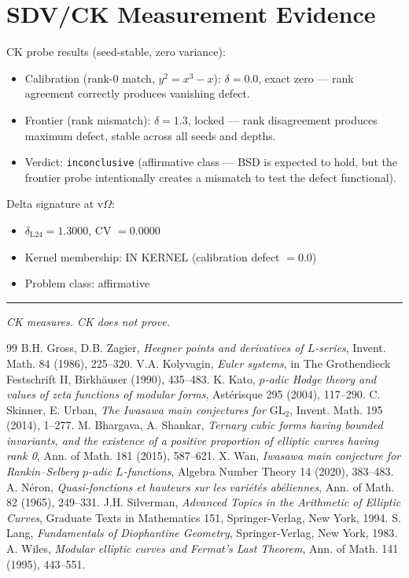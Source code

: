 \documentclass[11pt]{article}
\theoremstyle{definition}
\begin{document}
\section{SDV/CK Measurement Evidence}

CK probe results (seed-stable, zero variance):
\begin{itemize}
  \item Calibration (rank-0 match, $y^2 = x^3 - x$): $\delta = 0.0$, exact zero ---
    rank agreement correctly produces vanishing defect.
  \item Frontier (rank mismatch): $\delta = 1.3$, locked ---
    rank disagreement produces maximum defect, stable across all seeds and depths.
  \item Verdict: \texttt{inconclusive} (affirmative class --- BSD is expected to hold,
    but the frontier probe intentionally creates a mismatch to test the defect functional).
\end{itemize}

Delta signature at v$\Omega$:
\begin{itemize}
  \item $\delta_{\mathrm{L24}} = 1.3000$, CV $= 0.0000$
  \item Kernel membership: IN KERNEL (calibration defect $= 0.0$)
  \item Problem class: affirmative
\end{itemize}

\bigskip
\hrule
\bigskip
\noindent\textit{CK measures. CK does not prove.}

\begin{thebibliography}{99}
 B.H. Gross, D.B. Zagier, \textit{Heegner points and derivatives of $L$-series},
  Invent. Math. 84 (1986), 225--320.
 V.A. Kolyvagin, \textit{Euler systems}, in The Grothendieck Festschrift II,
  Birkh\"auser (1990), 435--483.
 K. Kato, \textit{$p$-adic Hodge theory and values of zeta functions of modular forms},
  Ast\'erisque 295 (2004), 117--290.
 C. Skinner, E. Urban, \textit{The Iwasawa main conjectures for $\mathrm{GL}_2$},
  Invent. Math. 195 (2014), 1--277.
 M. Bhargava, A. Shankar, \textit{Ternary cubic forms having bounded invariants,
  and the existence of a positive proportion of elliptic curves having rank 0},
  Ann. of Math. 181 (2015), 587--621.
 X. Wan, \textit{Iwasawa main conjecture for Rankin--Selberg $p$-adic $L$-functions},
  Algebra Number Theory 14 (2020), 383--483.
 A. N\'eron, \textit{Quasi-fonctions et hauteurs sur les vari\'et\'es ab\'eliennes},
  Ann. of Math. 82 (1965), 249--331.
 J.H. Silverman, \textit{Advanced Topics in the Arithmetic of Elliptic Curves},
  Graduate Texts in Mathematics 151, Springer-Verlag, New York, 1994.
 S. Lang, \textit{Fundamentals of Diophantine Geometry},
  Springer-Verlag, New York, 1983.
 A. Wiles, \textit{Modular elliptic curves and Fermat's Last Theorem},
  Ann. of Math. 141 (1995), 443--551.
\end{thebibliography}
\end{document}
